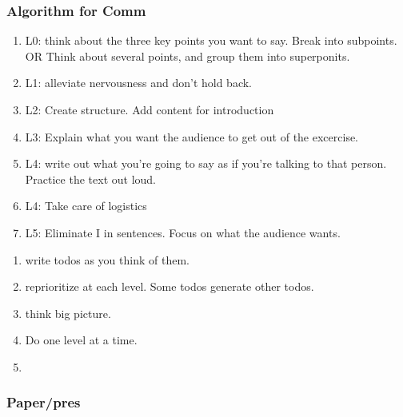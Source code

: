 \begin{frame}[label=alg]
\frametitle{Algorithm for Comm}
\begin{enumerate}
\tiny \item \tiny L0:  think about the three key points you want to
say. Break into subpoints.  OR  Think about several points, and group
them into superponits. 
\item \tiny L1:  alleviate nervousness and don't hold back. 
\item \tiny L2: Create structure. Add content for introduction  
\item \tiny L3: Explain what you want the audience to get out of the 
  excercise. 
\item \tiny L4: write out what you're going to say as if you're 
talking to that person. Practice the text out loud. 
\item \tiny L4: Take care of logistics 
\item \tiny L5: Eliminate I in sentences. Focus on what the
  audience wants. 
\end{enumerate}  
\begin{enumerate}
\tiny \item \tiny write todos as you think of them.
\item \tiny reprioritize at each level. Some todos generate other
  todos. 
\item \tiny think big picture. %
\item \tiny Do one level at a time. 
\item \tiny 
\end{enumerate}
\end{frame}

\begin{frame} 
\frametitle{Paper/pres} 
\end{frame} 

